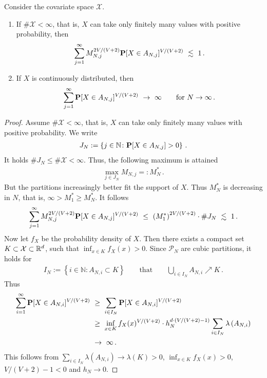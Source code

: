 \begin{lemma}
  Consider the covariate space $\mathcal{X}$. 
  \begin{enumerate}[label=(\roman*)]
    \item
If $\#\mathcal{X}<\infty$, that is, $X$ can take only finitely many values with positive probability,
then 
\begin{align*}
  \sum_{j=1}^{\infty} 
  M_{N,j}^{2V/(V+2)}
  \P
  [
  X\in A_{N,j}
  ]^{V/(V+2)}
  \ 
  \lesssim
  \ 
  1
  \,.
\end{align*}
\item
  If $X$ is continuously distributed, then
  \begin{align*}
  \sum_{j=1}^{\infty} 
  \P
  [
  X\in A_{N,j}
  ]^{V/(V+2)}
  \ 
  \to
  \ 
  \infty
  \qquad
  \text{for}\ 
  N\to\infty
  \,.
  \end{align*}
  \end{enumerate}
\end{lemma}

\begin{proof}
 Assume $\#\mathcal{X}<\infty$, that is, $X$ can take only finitely many values with positive probability.
We write
\begin{gather*}
  J_N
  :=
  \left\{ 
    j\in\mathbb{N}
    \colon
    \P[X\in A_{N,j}]>0
  \right\}
  \,.
\end{gather*}
It holds
$\#J_N\le \# \mathcal{X}<\infty$.
Thus, the following maximum is attained
\begin{gather*}
  \max_{j\in J_N} M_{N,j}
  =:M^*_N
  \,.
\end{gather*}
But the partitions increasingly better fit the support of $X$. Thus
$M^*_N$ is decreasing in $N$, that is,  $\infty>M^*_1\ge M^*_N$.
It follows
\begin{align*}
  \sum_{j=1}^{\infty} 
  M_{N,j}
  ^{2V/(V+2)}
  \P
  [
  X\in A_{N,j}
  ]^{V/(V+2)}
  \ 
  \le
  \ 
  \left( 
  M^*_1
  \right)
  ^{2V/(V+2)}
  \cdot
  \# J_N
  \ 
  \lesssim
  \ 
  1
  \,.
\end{align*}
Now let $f_X$ be the probability density of $X$. 
  Then there exists a compact set $K\subset\mathcal{X}\subset \R^d$, such that
  $
  \inf_{x\in K}f_X(x)
  >0
  $. Since $\mathcal{P}_N$ are cubic partitions, it holds for 
  \begin{gather*}
    I_N
    :=
    \left\{ 
      i\in\mathbb{N}\colon
      A_{N,i}\subset K
    \right\}
    \qquad
    \text{that}
    \qquad
    \bigcup_{i\in I_N}A_{N,i}\nearrow K
    \,.
  \end{gather*}
Thus
\begin{align*}
  \sum_{i=1}^\infty
  \P
  [
  X\in A_{N,i}
  ]^{V/(V+2)}
  &
  \ 
  \ge
  \ 
  \sum_{i\in I_N}
  \P
  [
  X\in A_{N,i}
  ]^{V/(V+2)}
  \\
  &
  \ 
  \ge
  \ 
  \inf_{x\in K}f_X(x)
  ^{V/(V+2)}
  \cdot 
  h_N^{d\cdot(V/(V+2)-1)}
  \sum_{i\in I_N}
  \lambda
  \left( 
  A_{N,i}
  \right)
  \\
  &
  \ 
  \to
  \ 
  \infty
  \,.
\end{align*}
This follows from
$
  \sum_{i\in I_N}
  \lambda
  \left( 
  A_{N,i}
  \right)
  \to 
  \lambda(K)>0
$,
  $
  \inf_{x\in K}f_X(x)
  >0
  $,
  $V/(V+2)-1<0$ and $h_N\to 0$.
\end{proof}

